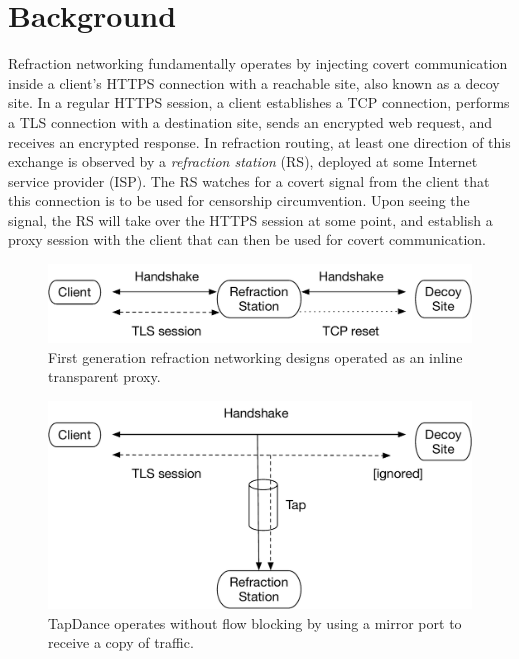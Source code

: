 \section{Background}

Refraction networking fundamentally operates by injecting covert communication inside a client's HTTPS connection with a reachable site, also known as a decoy site. In a regular HTTPS session, a client establishes a TCP connection, performs a TLS connection with a destination site, sends an encrypted web request, and receives an encrypted response. In refraction routing, at least one direction of this exchange is observed by a \emph{refraction station} (RS), deployed at some Internet service provider (ISP). The RS watches for a covert signal from the client that this connection is to be used for censorship circumvention. Upon seeing the signal, the RS will take over the HTTPS session at some point, and establish a proxy session with the client that can then be used for covert communication.

\begin{figure}
    \includegraphics[width=\columnwidth]{figures/refraction-v1}
    \caption{First generation refraction networking designs operated as an inline transparent proxy.}
    \label{fig:refraction-v1}
\end{figure}

\begin{figure}
    \includegraphics[width=\columnwidth]{figures/tapdance}
    \caption{TapDance operates without flow blocking by using a mirror
    port to receive a copy of traffic.}
    \label{fig:tapdance}
  \end{figure}

